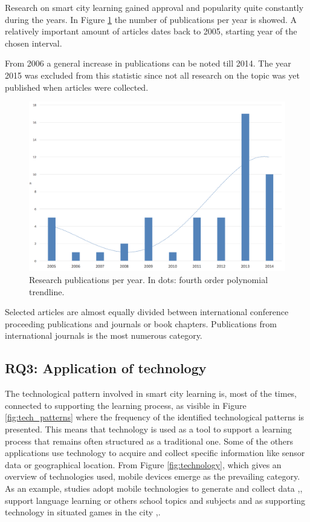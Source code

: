 Research on smart city learning gained approval and popularity quite constantly during the years. In Figure \ref{fig:years} the number of publications per year is showed. A relatively important amount of articles dates back to 2005, starting year of the chosen interval.

From 2006 a general increase in publications can be noted till 2014. The year 2015 was excluded from this statistic since not all research on the topic was yet published when articles were collected.

\begin{figure}[htb]
\centering
\includegraphics[width=12cm]{img/years}
\caption{Research publications per year. In dots: fourth order polynomial trendline.}
\label{fig:years}
\end{figure}

Selected articles are almost equally divided between international conference proceeding publications and journals or book chapters.
Publications from international journals is the most numerous category.


\subsection*{RQ3: Application of technology}

The technological pattern involved in smart city learning is, most of the times, connected to supporting the learning process, as visible in Figure \ref{fig:tech_patterns} where the frequency of the identified technological patterns is presented.
This means that technology is used as a tool to support a learning process that remains often structured as a traditional one.
Some of the others applications use technology to acquire and collect specific information like sensor data or geographical location.
From Figure \ref{fig:technology}, which gives an overview of technologies used, mobile devices emerge as the prevailing category.
As an example, studies adopt mobile technologies to generate and collect data \cite{philip_framework_2013},\cite{akkerman_storification_2009-1}, support language learning or others school topics and subjects \cite{gaved_challenges_2014} and as supporting technology in situated games in the city \cite{akkerman_storification_2009-1},\cite{huizenga_cognitive_2008}.

